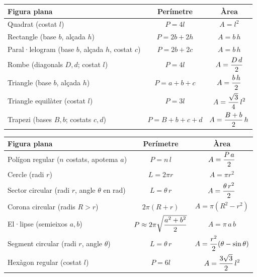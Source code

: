\renewcommand{\arraystretch}{1.9}\small
\newcommand{\aT}[2]{\begin{tabular}{@{}p{6.2cm}@{\hspace{0.5em}}c@{\hspace{0.5em}}c@{}}\toprule\textbf{#1}&\textbf{Perímetre}&\textbf{Àrea}\\\midrule #2 \\\bottomrule\end{tabular}}
\begin{center}
\aT{Figura plana}{
Quadrat (costat $l$) & $P=4l$ & $A=l^2$ \\
Rectangle (base $b$, alçada $h$) & $P=2b+2h$ & $A=b\,h$ \\
Paral·lelogram (base $b$, alçada $h$, costat $c$) & $P=2b+2c$ & $A=b\,h$ \\
Rombe (diagonals $D,d$; costat $l$) & $P=4l$ & $A=\displaystyle \frac{D\,d}{2}$ \\
Triangle (base $b$, alçada $h$) & $P=a+b+c$ & $A=\displaystyle \frac{b\,h}{2}$ \\
Triangle equilàter (costat $l$) & $P=3l$ & $A=\displaystyle \frac{\sqrt3}{4}\,l^2$ \\
Trapezi (bases $B,b$; costats $c,d$) & $P=B+b+c+d$ & $A=\displaystyle \frac{B+b}{2}\,h$}
\par\vspace{1.2em}
\aT{Figura plana}{
Polígon regular ($n$ costats, apotema $a$) & $P=n\,l$ & $A=\displaystyle \frac{P\,a}{2}$ \\
Cercle (radi $r$) & $L=2\pi r$ & $A=\pi r^2$ \\
Sector circular (radi $r$, angle $\theta$ en rad) & $L=\theta\,r$ & $A=\displaystyle \frac{\theta\,r^2}{2}$ \\
Corona circular (radis $R>r$) & $2\pi(R+r)$ & $A=\pi(R^2-r^2)$ \\
El·lipse (semieixos $a,b$) & $P\approx 2\pi\sqrt{\displaystyle \frac{a^2+b^2}{2}}$ & $A=\pi\,a\,b$ \\
Segment circular (radi $r$, angle $\theta$) & $L=\theta\,r$ & $A=\displaystyle \frac{r^2}{2}(\theta-\sin\theta)$ \\
Hexàgon regular (costat $l$) & $P=6l$ & $A=\displaystyle \frac{3\sqrt3}{2}\,l^2$}
\end{center}
\par\vspace{1.4em}
\renewcommand{\arraystretch}{2.05}
\newcommand{\vT}[2]{\begin{tabular}{@{}p{6.2cm}@{\hspace{0.5em}}c@{\hspace{0.5em}}c@{}}\toprule\textbf{#1}&\textbf{Àrea}&\textbf{Volum}\\\midrule #2 \\\bottomrule\end{tabular}}
